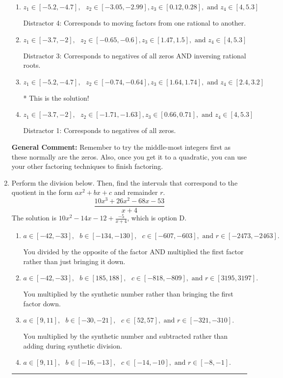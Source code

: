 \documentclass{extbook}[14pt]
\newcommand{\litem}[1]{\item #1

\rule{\textwidth}{0.4pt}}
\begin{document}
\begin{enumerate}
{\begin{enumerate}[label=\Alph*.]
 Distractor 2: Corresponds to inversing rational roots.
\item \( z_1 \in [-5.2, -4.7], \text{   }  z_2 \in [-3.05, -2.99], z_3 \in [0.12, 0.28], \text{   and   } z_4 \in [4, 5.3] \)

 Distractor 4: Corresponds to moving factors from one rational to another.
\item \( z_1 \in [-3.7, -2], \text{   }  z_2 \in [-0.65, -0.6], z_3 \in [1.47, 1.5], \text{   and   } z_4 \in [4, 5.3] \)

 Distractor 3: Corresponds to negatives of all zeros AND inversing rational roots.
\item \( z_1 \in [-5.2, -4.7], \text{   }  z_2 \in [-0.74, -0.64], z_3 \in [1.64, 1.74], \text{   and   } z_4 \in [2.4, 3.2] \)

* This is the solution!
\item \( z_1 \in [-3.7, -2], \text{   }  z_2 \in [-1.71, -1.63], z_3 \in [0.66, 0.71], \text{   and   } z_4 \in [4, 5.3] \)

 Distractor 1: Corresponds to negatives of all zeros.
\end{enumerate}

\textbf{General Comment:} Remember to try the middle-most integers first as these normally are the zeros. Also, once you get it to a quadratic, you can use your other factoring techniques to finish factoring.
}
\litem{
Perform the division below. Then, find the intervals that correspond to the quotient in the form $ax^2+bx+c$ and remainder $r$.
\[ \frac{10x^{3} +26 x^{2} -68 x -53}{x + 4} \]The solution is \( 10x^{2} -14 x -12 + \frac{-5}{x + 4} \), which is option D.\begin{enumerate}[label=\Alph*.]
\item \( a \in [-42, -33], \text{   } b \in [-134, -130], \text{   } c \in [-607, -603], \text{   and   } r \in [-2473, -2463]. \)

 You divided by the opposite of the factor AND multiplied the first factor rather than just bringing it down.
\item \( a \in [-42, -33], \text{   } b \in [185, 188], \text{   } c \in [-818, -809], \text{   and   } r \in [3195, 3197]. \)

 You multiplied by the synthetic number rather than bringing the first factor down.
\item \( a \in [9, 11], \text{   } b \in [-30, -21], \text{   } c \in [52, 57], \text{   and   } r \in [-321, -310]. \)

 You multiplied by the synthetic number and subtracted rather than adding during synthetic division.
\item \( a \in [9, 11], \text{   } b \in [-16, -13], \text{   } c \in [-14, -10], \text{   and   } r \in [-8, -1]. \)


\end{enumerate}}
\end{enumerate}
\end{document}
